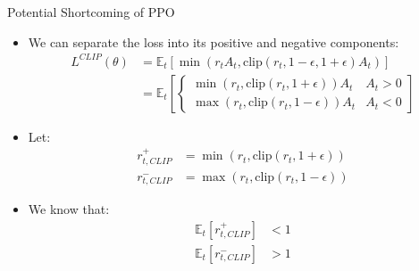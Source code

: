 \documentclass{beamer}
\begin{document}
\begin{frame}{Potential Shortcoming of PPO}
    \begin{itemize}
        \item We can separate the loss into its positive and negative
            components:
        \begin{align*}
            L^{CLIP}(\theta) &= \mathbb{E}_t\left[ 
            \min\left(r_tA_t, \text{clip}
            (r_t, 1 - \epsilon, 1 + \epsilon)A_t\right)\right]\\
            &= \mathbb{E}_t\left[ 
            \begin{cases}
                \min\left(r_t, \text{clip}
                (r_t, 1 + \epsilon)\right)A_t & A_t > 0\\
                \max\left(r_t, \text{clip}
                (r_t, 1 - \epsilon)\right)A_t & A_t < 0
            \end{cases}\right]
        \end{align*}
        \item Let:
        \begin{align*}
            r_{t, CLIP}^+ &= 
            \min\left(r_t, \text{clip}
            (r_t, 1 + \epsilon)\right)\\
            r_{t, CLIP}^- &= 
            \max\left(r_t, \text{clip}
            (r_t, 1 - \epsilon)\right)
        \end{align*}
        \item We know that:
        \begin{align*}
            \mathbb{E}_t[r_{t, CLIP}^+] &< 1\\
            \mathbb{E}_t[r_{t, CLIP}^-] &> 1\\
        \end{align*}\\


\end{itemize}
\end{frame}
\end{document}
